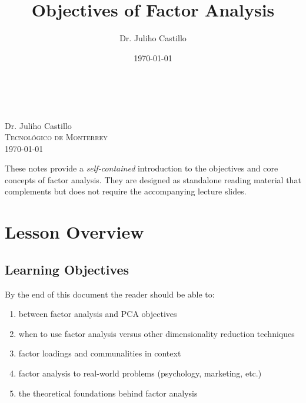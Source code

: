 \documentclass[a4paper]{tufte-book}
\title{Objectives of Factor Analysis}
\author{Dr. Juliho Castillo}
\date{\today}
\begin{document}
\begingroup
  \centering
  {\Huge{}}\\[0.8em]
  {\Large{}}\\[1.2em]
  {\large Dr. Juliho Castillo}\\[0.3em]
  {\normalsize\textsc{Tecnológico de Monterrey}}\\[0.8em]
  {\small\textcolor{primary}{\today}}
\par\vspace{2em}\endgroup

\noindent{} These notes provide a \textit{self-contained} introduction to the objectives and core concepts of factor analysis. They are designed as standalone reading material that complements but does not require the accompanying lecture slides.


\tableofcontents
\newpage

\section{Lesson Overview}

\subsection{Learning Objectives}
By the end of this document the reader should be able to:
\begin{enumerate}[leftmargin=*,itemsep=0.5em]
  \item {} between factor analysis and PCA objectives
  \item {} when to use factor analysis versus other dimensionality reduction techniques
  \item {} factor loadings and communalities in context
  \item {} factor analysis to real-world problems (psychology, marketing, etc.)
  \item {} the theoretical foundations behind factor analysis
\end{enumerate}
\end{document}
